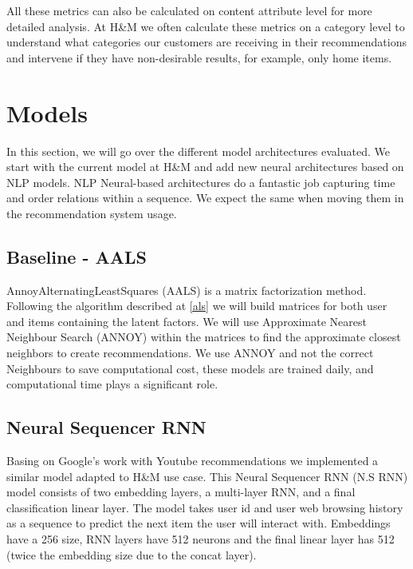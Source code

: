 \documentclass{tex_files/kththesis}
\begin{document}
All these metrics can also be calculated on content attribute level for more detailed analysis. At H\&M we often calculate these metrics on a category level to understand what categories our customers are receiving in their recommendations and intervene if they have non-desirable results, for example, only home items. 


\chapter{Models}
In this section, we will go over the different model architectures evaluated. We start with the current model at H\&M and add new neural architectures based on NLP models. NLP Neural-based architectures do a fantastic job capturing time and order relations within a sequence. We expect the same when moving them in the recommendation system usage.

\section{Baseline - AALS}
AnnoyAlternatingLeastSquares (AALS) is a matrix factorization method. Following the algorithm described at \ref{als} we will build matrices for both user and items containing the latent factors. We will use Approximate Nearest Neighbour Search \cite{annoy} (ANNOY) within the matrices to find the approximate closest neighbors to create recommendations. We use ANNOY and not the correct Neighbours to save computational cost, these models are trained daily, and computational time plays a significant role.


\section{Neural Sequencer RNN}
Basing on Google's work with Youtube recommendations \cite{rnn-youtube} we implemented a similar model adapted to H\&M use case. This Neural Sequencer RNN (N.S RNN) model consists of two embedding layers, a multi-layer RNN, and a final classification linear layer. The model takes user id and user web browsing history as a sequence to predict the next item the user will interact with. Embeddings have a 256 size, RNN layers have 512 neurons and the final linear layer has 512 (twice the embedding size due to the concat layer). 
\end{document}
